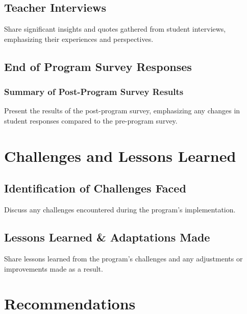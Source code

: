 \documentclass[
]{article}
\begin{document}
\hypertarget{teacher-interviews}{%
\subsection{Teacher Interviews}\label{teacher-interviews}}

Share significant insights and quotes gathered from student interviews,
emphasizing their experiences and perspectives.

\hypertarget{end-of-program-survey-responses}{%
\subsection{End of Program Survey
Responses}\label{end-of-program-survey-responses}}

\hypertarget{summary-of-post-program-survey-results}{%
\subsubsection{Summary of Post-Program Survey
Results}\label{summary-of-post-program-survey-results}}

Present the results of the post-program survey, emphasizing any changes
in student responses compared to the pre-program survey.

\hypertarget{challenges-and-lessons-learned}{%
\section{Challenges and Lessons
Learned}\label{challenges-and-lessons-learned}}

\hypertarget{identification-of-challenges-faced}{%
\subsection{Identification of Challenges
Faced}\label{identification-of-challenges-faced}}

Discuss any challenges encountered during the program's implementation.

\hypertarget{lessons-learned-adaptations-made}{%
\subsection{Lessons Learned \& Adaptations
Made}\label{lessons-learned-adaptations-made}}

Share lessons learned from the program's challenges and any adjustments
or improvements made as a result.

\hypertarget{recommendations}{%
\section{Recommendations}\label{recommendations}}
\end{document}
